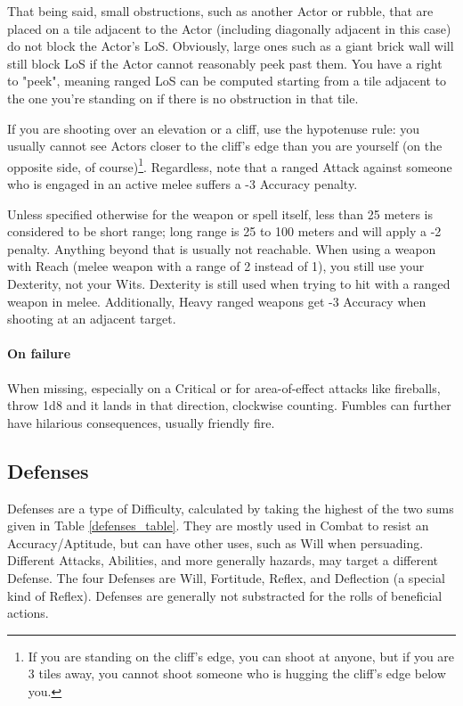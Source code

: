 That being said, small obstructions, such as another Actor or rubble, that are placed on a tile adjacent to the Actor (including diagonally adjacent in this case) do not block the Actor's LoS. Obviously, large ones such as a giant brick wall will still block LoS if the Actor cannot reasonably peek past them. You have a right to "peek", meaning ranged LoS can be computed starting from a tile adjacent to the one you're standing on if there is no obstruction in that tile. 

If you are shooting over an elevation or a cliff, use the hypotenuse rule: you usually cannot see Actors closer to the cliff's edge than you are yourself (on the opposite side, of course)\footnote{If you are standing on the cliff's edge, you can shoot at anyone, but if you are 3 tiles away, you cannot shoot someone who is hugging the cliff's edge below you.}. Regardless, note that a ranged Attack against someone who is engaged in an active melee suffers a -3 Accuracy penalty.

Unless specified otherwise for the weapon or spell itself, less than 25 meters is considered to be short range; long range is 25 to 100 meters and will apply a -2 penalty. Anything beyond that is usually not reachable. When using a weapon with Reach (melee weapon with a range of 2 instead of 1), you still use your Dexterity, not your Wits. Dexterity is still used when trying to hit with a ranged weapon in melee. Additionally, Heavy ranged weapons get -3 Accuracy when shooting at an adjacent target. 

\paragraph{On failure} 

When missing, especially on a Critical or for area-of-effect attacks like fireballs, throw 1d8 and it lands in that direction, clockwise counting. Fumbles can further have hilarious consequences, usually friendly fire.


\subsection{Defenses}
\label{defenses}

Defenses are a type of Difficulty, calculated by taking the highest of the two sums given in Table \ref{defenses_table}. They are mostly used in Combat to resist an Accuracy/Aptitude, but can have other uses, such as Will when persuading. Different Attacks, Abilities, and more generally hazards, may target a different Defense. The four Defenses are Will, Fortitude, Reflex, and Deflection (a special kind of Reflex). Defenses are generally not substracted for the rolls of beneficial actions. 

